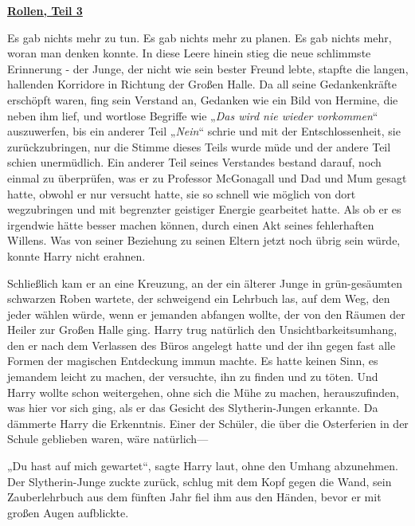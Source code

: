 

\hypertarget{rollen-teil-3}{%

\textbf{\uline{Rollen, Teil 3}}

Es gab nichts mehr zu tun. Es gab nichts mehr zu planen. Es gab nichts mehr, woran man denken konnte. In diese Leere hinein stieg die neue schlimmste Erinnerung - der Junge, der nicht wie sein bester Freund lebte, stapfte die langen, hallenden Korridore in Richtung der Großen Halle. Da all seine Gedankenkräfte erschöpft waren, fing sein Verstand an, Gedanken wie ein Bild von Hermine, die neben ihm lief, und wortlose Begriffe wie „\emph{Das wird nie wieder vorkommen}“ auszuwerfen, bis ein anderer Teil „\emph{Nein}“ schrie und mit der Entschlossenheit, sie zurückzubringen, nur die Stimme dieses Teils wurde müde und der andere Teil schien unermüdlich. Ein anderer Teil seines Verstandes bestand darauf, noch einmal zu überprüfen, was er zu Professor McGonagall und Dad und Mum gesagt hatte, obwohl er nur versucht hatte, sie so schnell wie möglich von dort wegzubringen und mit begrenzter geistiger Energie gearbeitet hatte. Als ob er es irgendwie hätte besser machen können, durch einen Akt seines fehlerhaften Willens. Was von seiner Beziehung zu seinen Eltern jetzt noch übrig sein würde, konnte Harry nicht erahnen.

Schließlich kam er an eine Kreuzung, an der ein älterer Junge in grün-gesäumten schwarzen Roben wartete, der schweigend ein Lehrbuch las, auf dem Weg, den jeder wählen würde, wenn er jemanden abfangen wollte, der von den Räumen der Heiler zur Großen Halle ging. Harry trug natürlich den Unsichtbarkeitsumhang, den er nach dem Verlassen des Büros angelegt hatte und der ihn gegen fast alle Formen der magischen Entdeckung immun machte. Es hatte keinen Sinn, es jemandem leicht zu machen, der versuchte, ihn zu finden und zu töten. Und Harry wollte schon weitergehen, ohne sich die Mühe zu machen, herauszufinden, was hier vor sich ging, als er das Gesicht des Slytherin-Jungen erkannte. Da dämmerte Harry die Erkenntnis. Einer der Schüler, die über die Osterferien in der Schule geblieben waren, wäre natürlich—

„Du hast auf mich gewartet“, sagte Harry laut, ohne den Umhang abzunehmen. Der Slytherin-Junge zuckte zurück, schlug mit dem Kopf gegen die Wand, sein Zauberlehrbuch aus dem fünften Jahr fiel ihm aus den Händen, bevor er mit großen Augen aufblickte.

}
